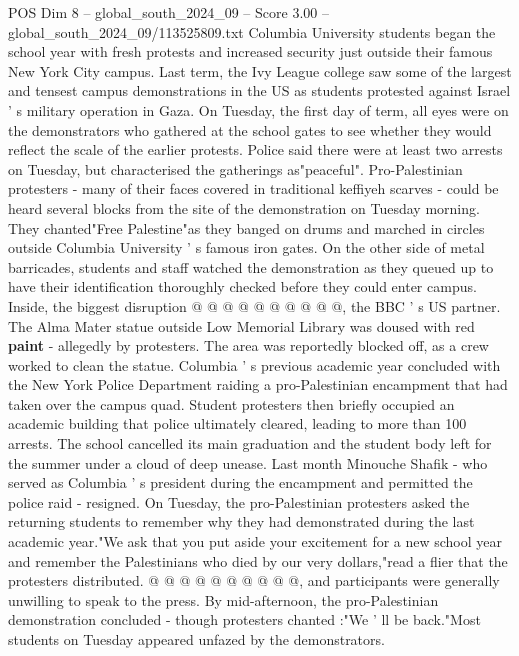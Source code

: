 \begin{textsample}{POS Dim 8 – global\_south\_2024\_09 – Score 3.00 – global\_south\_2024\_09/113525809.txt}  \label{ex:f8_pos_282}
Columbia University students began the school year with fresh protests and increased security just outside their famous New York City campus.
Last term, the Ivy League college saw some of the largest and tensest campus demonstrations in the US as students protested against Israel ' s military operation in Gaza.
On Tuesday, the first day of term, all eyes were on the demonstrators who gathered at the school gates to see whether they would reflect the scale of the earlier protests.
Police said there were at least two arrests on Tuesday, but characterised the gatherings as"peaceful".
Pro-Palestinian protesters - many of their faces covered in traditional keffiyeh scarves - could be heard several blocks from the site of the demonstration on Tuesday morning.
They chanted"Free Palestine"as they banged on drums and marched in circles outside Columbia University ' s famous iron gates.
On the other side of metal barricades, students and staff watched the demonstration as they queued up to have their identification thoroughly checked before they could enter campus.
Inside, the biggest disruption @ @ @ @ @ @ @ @ @ @, the BBC ' s US partner.
The Alma Mater statue outside Low Memorial Library was doused with red \textbf{paint} - allegedly by protesters.
The area was reportedly blocked off, as a crew worked to clean the statue.
Columbia ' s previous academic year concluded with the New York Police Department raiding a pro-Palestinian encampment that had taken over the campus quad.
Student protesters then briefly occupied an academic building that police ultimately cleared, leading to more than 100 arrests.
The school cancelled its main graduation and the student body left for the summer under a cloud of deep unease.
Last month Minouche Shafik - who served as Columbia ' s president during the encampment and permitted the police raid - resigned.
On Tuesday, the pro-Palestinian protesters asked the returning students to remember why they had demonstrated during the last academic year."We ask that you put aside your excitement for a new school year and remember the Palestinians who died by our very dollars,"read a flier that the protesters distributed. @ @ @ @ @ @ @ @ @ @, and participants were generally unwilling to speak to the press.
By mid-afternoon, the pro-Palestinian demonstration concluded - though protesters chanted :"We ' ll be back."Most students on Tuesday appeared unfazed by the demonstrators.

\end{textsample}
